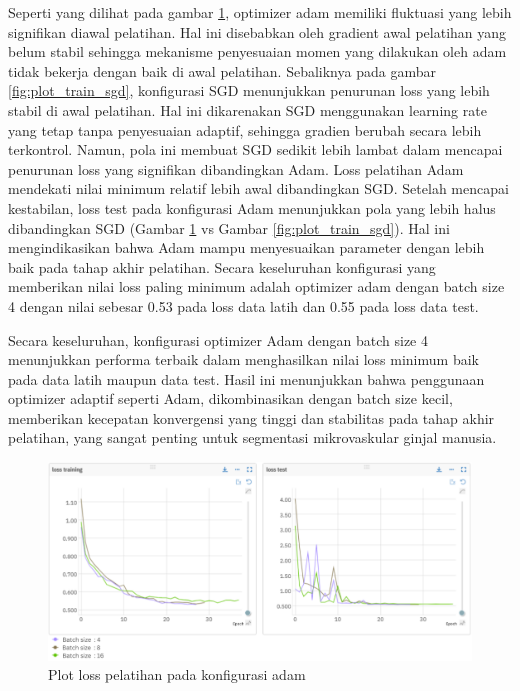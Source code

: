 Seperti yang dilihat pada gambar \ref{fig:plot_train_adam}, optimizer adam memiliki fluktuasi yang lebih signifikan diawal pelatihan. Hal ini disebabkan oleh gradient awal pelatihan yang belum stabil sehingga mekanisme penyesuaian momen yang dilakukan oleh adam tidak bekerja dengan baik di awal pelatihan. Sebaliknya pada gambar \ref{fig:plot_train_sgd}, konfigurasi SGD menunjukkan penurunan loss yang lebih stabil di awal pelatihan. Hal ini dikarenakan SGD menggunakan learning rate yang tetap tanpa penyesuaian adaptif, sehingga gradien berubah secara lebih terkontrol. Namun, pola ini membuat SGD sedikit lebih lambat dalam mencapai penurunan loss yang signifikan dibandingkan Adam. Loss pelatihan Adam mendekati nilai minimum relatif lebih awal dibandingkan SGD. Setelah mencapai kestabilan, loss test pada konfigurasi Adam menunjukkan pola yang lebih halus dibandingkan SGD (Gambar \ref{fig:plot_train_adam} vs Gambar \ref{fig:plot_train_sgd}). Hal ini mengindikasikan bahwa Adam mampu menyesuaikan parameter dengan lebih baik pada tahap akhir pelatihan. Secara keseluruhan konfigurasi yang memberikan nilai loss paling minimum adalah optimizer adam dengan batch size 4 dengan nilai sebesar 0.53 pada loss data latih dan 0.55 pada loss data test.

Secara keseluruhan, konfigurasi optimizer Adam dengan batch size 4 menunjukkan performa terbaik dalam menghasilkan nilai loss minimum baik pada data latih maupun data test. Hasil ini menunjukkan bahwa penggunaan optimizer adaptif seperti Adam, dikombinasikan dengan batch size kecil, memberikan kecepatan konvergensi yang tinggi dan stabilitas pada tahap akhir pelatihan, yang sangat penting untuk segmentasi mikrovaskular ginjal manusia.


\begin{figure}[H]
	\centering
	\includegraphics[width=1\textwidth]{gambar/bab4/loss_adam.png}
	\caption{Plot loss pelatihan pada konfigurasi adam}
	\label{fig:plot_train_adam}
\end{figure}

